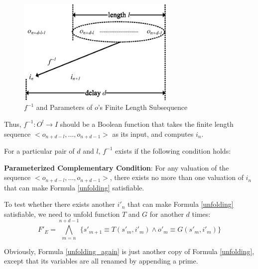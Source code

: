 \documentclass[journal]{IEEEtran}
\begin{document}
\begin{figure}[t]
\centering
\includegraphics[width=3in]{dl}
\caption{$f^{-1}$ and Parameters of $o$'s Finite Length Subsequence }
\label{dl}
\end{figure}

Thus,
$f^{-1}:O^l\to I$ should be a Boolean function that takes the finite length sequence $<o_{n+d-l},\dots , o_{n+d-1} >$ as its input,
and computes $i_n$.

For a particular pair of $d$ and $l$,
$f^{-1}$ exists if the following condition holds:

\vspace{0.2cm}

\begin{definition11}\label{UniquenessAssumption}
\textbf{Parameterized Complementary Condition}:
For any valuation of the sequence $<o_{n+d-l},\dots , o_{n+d-1} >$,
there exists no more than one valuation of $i_n$
that can make Formula \ref{unfolding} satisfiable.
\end{definition11}

\vspace{0.2cm}

To test whether there exists another $i'_n$ that can make Formula \ref{unfolding} satisfiable,
we need to unfold function $T$ and $G$ for another $d$ times:
\begin{equation}\label{unfolding_again}
F'_{E}= \bigwedge_{m=n}^{n+d-1} \Big\{ s'_{m+1}\equiv T(s'_m,i'_m) \wedge  o'_m\equiv G(s'_m,i'_m) \Big\}
\end{equation}

Obviously,
Formula \ref{unfolding_again} is just another copy of Formula \ref{unfolding},
except that its variables are all renamed by appending a prime.
\end{document}
